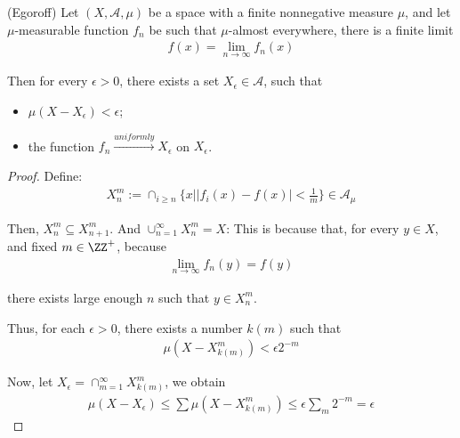 \documentclass[Total.tex]{subfiles}
\begin{document}
			
			\begin{theorem}
				(Egoroff) Let $(X,\mathcal{A},\mu)$ be a space with a finite nonnegative measure $\mu$, and let $\mu$-measurable function $f_n$ be such that $\mu$-almost everywhere, there is a finite limit
				\begin{gather*}
					f(x)=\lim_{n\rightarrow\infty} f_n(x)
				\end{gather*}
				
				Then for every $\epsilon>0$, there exists a set $X_\epsilon\in \mathcal{A}$, such that
				\begin{itemize}
					\item $\mu(X-X_\epsilon)<\epsilon$;
					\item the function $f_n\stackrel{uniformly}{\rightarrow} X_\epsilon$ on $X_\epsilon$. 
				\end{itemize}
			\end{theorem}
			\begin{proof}
				Define:
				\begin{gather*}
					X^m_n:=\cap_{i\geq n} \{x||f_i(x)-f(x)|<\frac{1}{m}\}\in \mathcal{A}_\mu
				\end{gather*}
				
				Then, $X^m_n\subseteq X_{n+1}^m$. And $\cup_{n=1}^\infty X_n^m=X$: This is because that, for every $y\in X$, and fixed $m\in \ZZ^+$, because
				\begin{gather*}
					\lim_{n\rightarrow\infty} f_n(y)=f(y)
				\end{gather*}
				
				there exists large enough $n$ such that $y\in X^m_n$. 
				
				Thus, for each $\epsilon>0$, there exists a number $k(m)$ such that
				\begin{gather*}
					\mu(X-X_{k(m)}^m)<\epsilon 2^{-m}
				\end{gather*}
				
				Now, let $X_\epsilon=\cap_{m=1}^\infty X_{k(m)}^m$, we obtain
				\begin{gather*}
					\mu(X-X_\epsilon)\leq \sum \mu(X-X_{k(m)}^m)\leq \epsilon\sum_m 2^{-m}=\epsilon
				\end{gather*}
			\end{proof}
			
\end{document}
